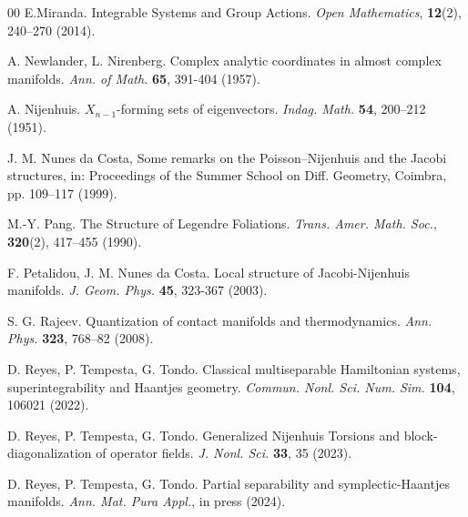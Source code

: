 \documentclass[10pt]{amsart}
\numberwithin{equation}{section}
\newcommand{\tbf}{\textbf}
\theoremstyle{definition}
\begin{document}
\begin{thebibliography}{00}
 E.Miranda. Integrable Systems and Group Actions. \textit{Open Mathematics}, \tbf{12}(2), 240–270 (2014). 

 A. Newlander, L. Nirenberg. Complex analytic coordinates in almost complex manifolds. \textit{Ann. of Math.} \textbf{65}, 391-404 (1957).

 A. Nijenhuis. $X_{n-1}$-forming sets of eigenvectors. \textit{Indag. Math.}  \textbf{54}, 200--212 (1951).

  J. M. Nunes da Costa, Some remarks on the Poisson–Nijenhuis and the Jacobi structures, in: Proceedings of
the Summer School on Diff. Geometry, Coimbra, pp. 109–117 (1999).



 M.-Y. Pang. The Structure of Legendre Foliations. \textit{Trans. Amer. Math. Soc.}, \tbf{320}(2),
417–455 (1990). 

 F. Petalidou, J. M. Nunes da Costa. Local structure of Jacobi-Nijenhuis manifolds. \textit{J. Geom. Phys.} \tbf{45}, 323-367 (2003).

 S. G. Rajeev. Quantization of contact manifolds and thermodynamics. \textit{Ann. Phys.} \tbf{323}, 768–82 (2008).

 D. Reyes, P. Tempesta, G. Tondo. Classical multiseparable Hamiltonian systems, superintegrability and Haantjes geometry. \textit{Commun. Nonl. Sci. Num. Sim.} \tbf{104}, 106021  (2022).

 D. Reyes, P. Tempesta, G. Tondo. Generalized Nijenhuis Torsions and block-diagonalization of operator fields. \textit{J. Nonl. Sci. } \textbf{33}, 35 (2023).

 D. Reyes, P. Tempesta, G. Tondo. Partial separability and symplectic-Haantjes manifolds. \textit{Ann. Mat. Pura Appl.}, in press (2024).



\end{thebibliography}
\end{document}
